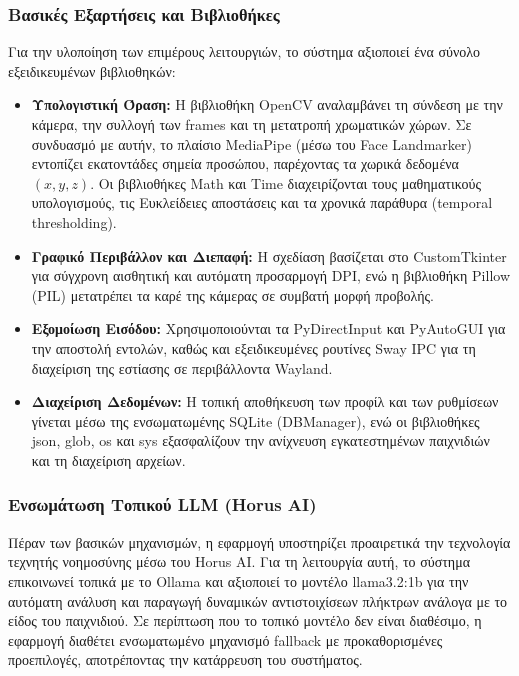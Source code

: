 \documentclass[twoside, a4paper, 11pt]{article}
\newcommand{\textlatin}[1]{\textenglish{#1}}
\begin{document}
\subsubsection{Βασικές Εξαρτήσεις και Βιβλιοθήκες}
Για την υλοποίηση των επιμέρους λειτουργιών, το σύστημα αξιοποιεί ένα σύνολο εξειδικευμένων βιβλιοθηκών:
\begin{itemize}
    \item \textbf{Υπολογιστική Όραση:} Η βιβλιοθήκη \textlatin{OpenCV} αναλαμβάνει τη σύνδεση με την κάμερα, την συλλογή των frames και τη μετατροπή χρωματικών χώρων. Σε συνδυασμό με αυτήν, το πλαίσιο \textlatin{MediaPipe} (μέσω του \textlatin{Face Landmarker}) εντοπίζει εκατοντάδες σημεία προσώπου, παρέχοντας τα χωρικά δεδομένα $(x,y,z)$. Οι βιβλιοθήκες \textlatin{Math} και \textlatin{Time} διαχειρίζονται τους μαθηματικούς υπολογισμούς, τις Ευκλείδειες αποστάσεις και τα χρονικά παράθυρα (\textlatin{temporal thresholding}).
    \item \textbf{Γραφικό Περιβάλλον και Διεπαφή:} Η σχεδίαση βασίζεται στο \textlatin{CustomTkinter} για σύγχρονη αισθητική και αυτόματη προσαρμογή \textlatin{DPI}, ενώ η βιβλιοθήκη \textlatin{Pillow (PIL)} μετατρέπει τα καρέ της κάμερας σε συμβατή μορφή προβολής.
    \item \textbf{Εξομοίωση Εισόδου:} Χρησιμοποιούνται τα \textlatin{PyDirectInput} και \textlatin{PyAutoGUI} για την αποστολή εντολών, καθώς και εξειδικευμένες ρουτίνες \textlatin{Sway IPC} για τη διαχείριση της εστίασης σε περιβάλλοντα Wayland.
    \item \textbf{Διαχείριση Δεδομένων:} Η τοπική αποθήκευση των προφίλ και των ρυθμίσεων γίνεται μέσω της ενσωματωμένης \textlatin{SQLite} (\textlatin{DBManager}), ενώ οι βιβλιοθήκες \textlatin{json}, \textlatin{glob}, \textlatin{os} και \textlatin{sys} εξασφαλίζουν την ανίχνευση εγκατεστημένων παιχνιδιών και τη διαχείριση αρχείων.
\end{itemize}

\subsubsection{Ενσωμάτωση Τοπικού LLM (Horus AI)}
Πέραν των βασικών μηχανισμών, η εφαρμογή υποστηρίζει προαιρετικά την τεχνολογία τεχνητής νοημοσύνης μέσω του \textlatin{Horus AI}. Για τη λειτουργία αυτή, το σύστημα επικοινωνεί τοπικά με το \textlatin{Ollama} και αξιοποιεί το μοντέλο \textlatin{llama3.2:1b} για την αυτόματη ανάλυση και παραγωγή δυναμικών αντιστοιχίσεων πλήκτρων ανάλογα με το είδος του παιχνιδιού. Σε περίπτωση που το τοπικό μοντέλο δεν είναι διαθέσιμο, η εφαρμογή διαθέτει ενσωματωμένο μηχανισμό \textlatin{fallback} με προκαθορισμένες προεπιλογές, αποτρέποντας την κατάρρευση του συστήματος.
\end{document}
